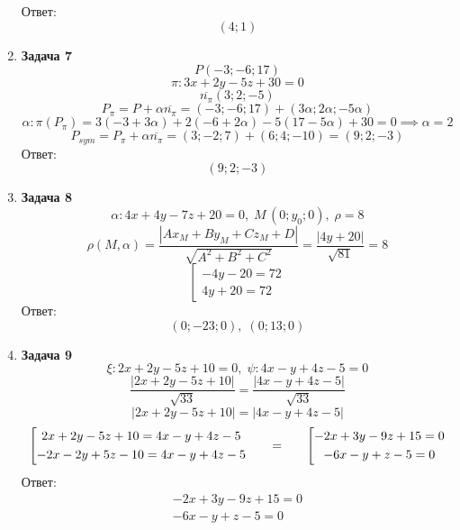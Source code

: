 \documentclass{article}
\theoremstyle{plain}
\begin{document}
\begin{enumerate}
Ответ:
$$(4; 1)$$
\item \textbf{Задача 7}
$$P(-3; -6; 17)$$
$$\pi: 3x + 2y - 5z + 30 = 0$$
$$\overline{n_\pi}(3; 2; -5)$$
$$P_\pi = P + \alpha\overline{n_\pi} = (-3; -6; 17) + (3\alpha; 2\alpha; -5\alpha)$$
$$\alpha: \pi(P_\pi) = 3(-3 + 3\alpha) + 2(-6 + 2\alpha) - 5(17 - 5\alpha) + 30 = 0 \implies \alpha = 2$$
$$P_{sym} = P_\pi + \alpha\overline{n_\pi} = (3; -2; 7) + (6; 4; -10) = (9; 2; -3)$$
Ответ:
$$(9; 2; -3)$$
\item \textbf{Задача 8}
$$\alpha: 4x + 4y - 7z +20 = 0,\; M\,(0; y_0; 0),\; \rho = 8$$
$$\rho(M, \alpha) = \frac{|Ax_M + By_M + Cz_M + D|}{\sqrt{A^2 + B^2 + C^2}} = \frac{|4y +  20|}{\sqrt{81}} = 8$$
$$ \left[ \begin{gathered}
    -4y - 20 = 72\\
    4y + 20 = 72
\end{gathered} 
\right.$$
Ответ: 
$$(0; -23; 0),\; (0; 13; 0)$$

\item \textbf{Задача 9}
$$\xi : 2x + 2y - 5z + 10 = 0,\; \psi : 4x - y + 4z - 5 = 0$$
$$\frac{|2x + 2y - 5z + 10|}{\sqrt{33}} = \frac{|4x - y + 4z - 5|}{\sqrt{33}}$$
$$|2x + 2y - 5z + 10| = |4x - y + 4z - 5|$$
$$\left[ 
    \begin{gathered}
    2x + 2y - 5z + 10 = 4x - y + 4z - 5 \\
    -2x - 2y + 5z - 10 = 4x - y + 4z - 5
    \end{gathered} \right.
\hspace{6mm}    = \hspace{6mm}
\left [
    \begin{gathered}
    -2x + 3y - 9z + 15 = 0 \\
    -6x - y + z - 5 = 0
    \end{gathered}
    \right.$$
Ответ:
$$
    \begin{gathered}
    -2x + 3y - 9z + 15 = 0 \\
    -6x - y + z - 5 = 0
    \end{gathered}
  $$


\end{enumerate}
\end{document}

